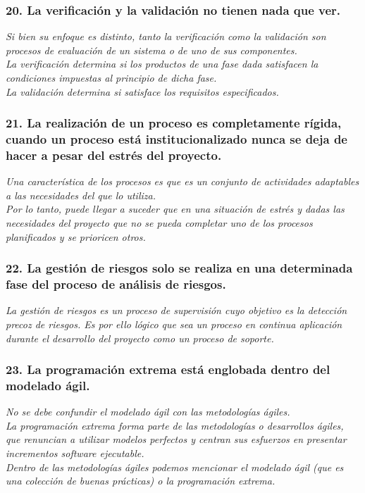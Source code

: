 \subsubsection*{20. La verificación y la validación no tienen nada que ver.}
\textit{Si bien su enfoque es distinto, tanto la verificación como la validación son procesos de evaluación de un sistema o de uno de sus componentes.\\ %
La verificación determina si los productos de una fase dada satisfacen la condiciones impuestas al principio de dicha fase.\\
La validación determina si satisface los requisitos especificados.
}
\subsubsection*{21. La realización de un proceso es completamente rígida, cuando un proceso está institucionalizado nunca se deja de hacer a pesar del estrés del proyecto.}
\textit{Una característica de los procesos es que es un conjunto de actividades adaptables a las necesidades del que lo utiliza.
\\
Por lo tanto, puede llegar a suceder que en una situación de estrés y dadas las necesidades del proyecto que no se pueda completar uno de los procesos planificados y se prioricen otros.
}

\subsubsection*{22. La gestión de riesgos solo se realiza en una determinada fase del proceso de análisis de riesgos.}
\textit{La gestión de riesgos es un proceso de supervisión cuyo objetivo es la detección precoz de riesgos. Es por ello lógico que sea un proceso en continua aplicación durante el desarrollo del proyecto como un proceso de soporte.
}

\subsubsection*{23. La programación extrema está englobada dentro del modelado ágil.}
\textit{No se debe confundir el modelado ágil con las metodologías ágiles.
\\
La programación extrema forma parte de las metodologías o desarrollos ágiles, que renuncian a utilizar modelos perfectos y centran sus esfuerzos en presentar incrementos software ejecutable.
\\
Dentro de las metodologías ágiles podemos mencionar el modelado ágil (que es una colección de buenas prácticas) o la programación extrema.
}
